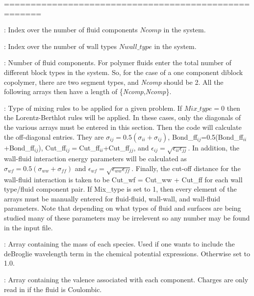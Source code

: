 \documentclass[10pt,onecolumn]{article}
\begin{document}
\noindent=====================================================
\vspace{0.1in}


\vspace{0.1in}
: Index over the number of fluid components
$Ncomp$ in the system.

\vspace{0.1in}
: Index over the number of wall types
$Nwall\_type$ in the system.

\vspace{0.1in}
: Number of fluid components.  For polymer fluids enter
the total number of different block types in the system.
So, for the case of a one component diblock
copolymer, there are two segment types, and {\it Ncomp} should be 2.
All the following arrays then have a length of \{{\it Ncomp},{\it Ncomp}\}.

\vspace{0.1in}
: Type of mixing rules to be applied for a given problem.
If $Mix\_type=0$ then the Lorentz-Berthlot rules will be applied.  In these cases,
only the diagonals of the various arrays must be entered in this section.  Then the code will
calculate the off-diagonal entries.  They are
$\sigma_{ij}=0.5(\sigma_{ii}+\sigma_{ij})$, Bond\_ff$_{ij}$=0.5(Bond\_ff$_{ii}$+Bond\_ff$_{ij}$), Cut\_ff$_{ij}=$Cut\_ff$_{ii}$+Cut\_ff$_{jj}$,  and
$\epsilon_{ij}=\sqrt{\epsilon_{ii}\epsilon_{jj}}$.  In addition, the wall-fluid interaction
energy parameters will be calculated as
$\sigma_{wf}=0.5(\sigma_{ww}+\sigma_{ff})$ and
$\epsilon_{wf}=\sqrt{\epsilon_{ww} \epsilon_{ff}}$. Finally, the cut-off distance for
the wall-fluid interaction is taken to be Cut\_wf = Cut\_ww + Cut\_ff for each wall type/fluid component pair.
If Mix\_type is set to 1, then every element of the arrays must be manually entered
for fluid-fluid, wall-wall, and wall-fluid parameters.  Note that depending on
what types of fluid and surfaces are being studied many of these parameters may be
irrelevent so any number may be found in the input file.

\vspace{0.1in}
:  Array containing the mass of each
species.  Used if one wants to include the deBroglie wavelength
term in the chemical potential expressions.  Otherwise set to
1.0.

\vspace{0.1in}
:  Array containing the valence associated with
each component.  Charges are only read in if the fluid is Coulombic.
\end{document}
